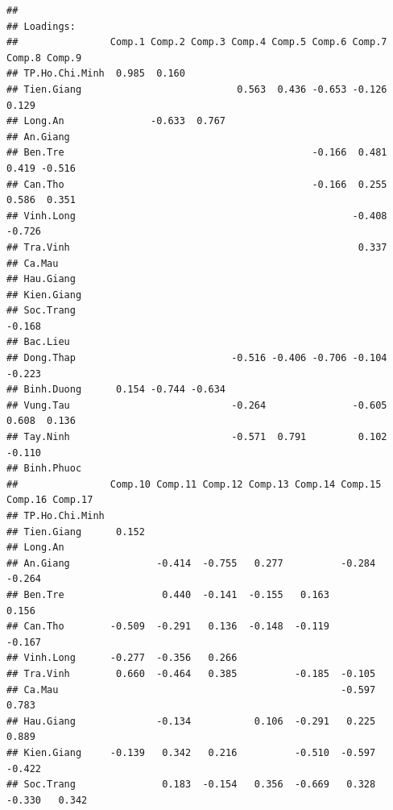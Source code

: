 \documentclass[../thesis.tex]{subfiles}
\begin{document}
\begin{verbatim}
## 
## Loadings:
##                Comp.1 Comp.2 Comp.3 Comp.4 Comp.5 Comp.6 Comp.7 Comp.8 Comp.9
## TP.Ho.Chi.Minh  0.985  0.160                                                 
## Tien.Giang                           0.563  0.436 -0.653 -0.126         0.129
## Long.An               -0.633  0.767                                          
## An.Giang                                                                     
## Ben.Tre                                           -0.166  0.481  0.419 -0.516
## Can.Tho                                           -0.166  0.255  0.586  0.351
## Vinh.Long                                                -0.408        -0.726
## Tra.Vinh                                                  0.337              
## Ca.Mau                                                                       
## Hau.Giang                                                                    
## Kien.Giang                                                                   
## Soc.Trang                                                              -0.168
## Bac.Lieu                                                                     
## Dong.Thap                           -0.516 -0.406 -0.706 -0.104 -0.223       
## Binh.Duong      0.154 -0.744 -0.634                                          
## Vung.Tau                            -0.264               -0.605  0.608  0.136
## Tay.Ninh                            -0.571  0.791         0.102 -0.110       
## Binh.Phuoc                                                                   
##                Comp.10 Comp.11 Comp.12 Comp.13 Comp.14 Comp.15 Comp.16 Comp.17
## TP.Ho.Chi.Minh                                                                
## Tien.Giang      0.152                                                         
## Long.An                                                                       
## An.Giang               -0.414  -0.755   0.277          -0.284          -0.264 
## Ben.Tre                 0.440  -0.141  -0.155   0.163           0.156         
## Can.Tho        -0.509  -0.291   0.136  -0.148  -0.119          -0.167         
## Vinh.Long      -0.277  -0.356   0.266                                         
## Tra.Vinh        0.660  -0.464   0.385          -0.185  -0.105                 
## Ca.Mau                                                 -0.597           0.783 
## Hau.Giang              -0.134           0.106  -0.291   0.225   0.889         
## Kien.Giang     -0.139   0.342   0.216          -0.510  -0.597          -0.422 
## Soc.Trang               0.183  -0.154   0.356  -0.669   0.328  -0.330   0.342 

\end{verbatim}
\end{document}

